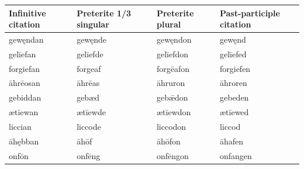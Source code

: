 \par\begingroup
\fontsize{10.5}{13.2}\selectfont
\setlength{\LTleft}{0pt}\setlength{\LTright}{\fill}
\noindent
\begin{tabular}{@{}>{\raggedright\arraybackslash}p{27.02mm}>{\raggedright\arraybackslash}p{28.55mm}>{\raggedright\arraybackslash}p{23.36mm}>{\raggedright\arraybackslash}p{36.63mm}@{}}
\toprule
\textbf{Infinitive citation} & \textbf{Preterite 1/\allowbreak{}3 singular} & \textbf{Preterite plural} & \textbf{Past-participle citation} \\
\midrule
gewęndan & gewęnde & gewęndon & gewęnd \\
gelīefan & gelīefde & gelīefdon & gelīefed \\
forgiefan & forgeaf & forgēafon & forgiefen \\
āhrēosan & āhrēas & āhruron & āhroren \\
gebiddan & gebæd & gebǣdon & gebeden \\
ætīewan & ætīewde & ætīewdon & ætīewed \\
liccian & liccode & liccodon & liccod \\
āhębban & āhōf & āhōfon & āhafen \\
onfōn & onfēng & onfēngon & onfangen \\
\bottomrule
\end{tabular}
\par\endgroup

